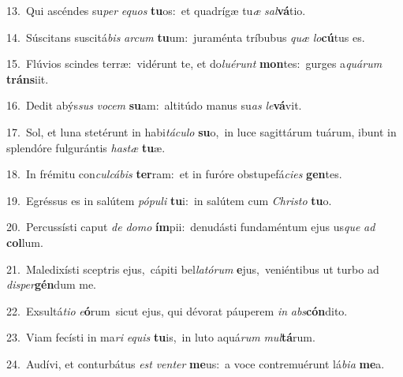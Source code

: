 {\numbfont\textcolor{\numbcolor}{13.}}~Qui ascéndes su\textit{per} \textit{e}\-\textit{quos} \textbf{tu}\-os:~\star et quadrígæ tu\textit{æ} \textit{sal}\-\textbf{vá}tio.\par
{\numbfont\textcolor{\numbcolor}{14.}}~Súscitans suscitá\textit{bis} \textit{ar}\-\textit{cum} \textbf{tu}\-um:~\star juraménta tríbubus \textit{quæ} \textit{lo}\-\textbf{cú}tus es.\par
{\numbfont\textcolor{\numbcolor}{15.}}~Flúvios scindes terræ:~\dagger vidérunt te, et do\-\textit{lu}\-\textit{é}\textit{runt} \textbf{mon}\-tes:~\star gurges a\-\textit{quá}\-\textit{rum} \textbf{tráns}\-iit.\par
{\numbfont\textcolor{\numbcolor}{16.}}~Dedit abýs\textit{sus} \textit{vo}\-\textit{cem} \textbf{su}\-am:~\star altitúdo manus su\textit{as} \textit{le}\-\textbf{vá}vit.\par
{\numbfont\textcolor{\numbcolor}{17.}}~Sol, et luna stetérunt in habi\-\textit{tá}\-\textit{cu}\textit{lo} \textbf{su}\-o,~\star in luce sagittárum tuárum, ibunt in splendóre fulgurántis \textit{has}\-\textit{tæ} \textbf{tu}\-æ.\par
{\numbfont\textcolor{\numbcolor}{18.}}~In frémitu con\-\textit{cul}\-\textit{cá}\textit{bis} \textbf{ter}\-ram:~\star et in furóre obstupefá\-\textit{ci}\-\textit{es} \textbf{gen}\-tes.\par
{\numbfont\textcolor{\numbcolor}{19.}}~Egréssus es in salútem \textit{pó}\-\textit{pu}\textit{li} \textbf{tu}\-i:~\star in salútem cum \textit{Chris}\-\textit{to} \textbf{tu}\-o.\par
{\numbfont\textcolor{\numbcolor}{20.}}~Percussísti caput \textit{de} \textit{do}\-\textit{mo} \textbf{ím}\-pii:~\star denudásti fundaméntum ejus us\textit{que} \textit{ad} \textbf{col}\-lum.\par
{\numbfont\textcolor{\numbcolor}{21.}}~Maledixísti sceptris ejus,~\dagger cápiti bel\-\textit{la}\-\textit{tó}\textit{rum} \textbf{e}\-jus,~\star veniéntibus ut turbo ad \textit{di}\-\textit{sper}\textbf{gén}dum me.\par
{\numbfont\textcolor{\numbcolor}{22.}}~Exsultá\-\textit{ti}\-\textit{o} \textit{e}\-\textbf{ó}rum~\star sicut ejus, qui dévorat páuperem \textit{in} \textit{abs}\-\textbf{cón}dito.\par
{\numbfont\textcolor{\numbcolor}{23.}}~Viam fecísti in ma\textit{ri} \textit{e}\-\textit{quis} \textbf{tu}\-is,~\star in luto aquá\textit{rum} \textit{mul}\-\textbf{tá}rum.\par
{\numbfont\textcolor{\numbcolor}{24.}}~Audívi, et conturbátus \textit{est} \textit{ven}\-\textit{ter} \textbf{me}\-us:~\star a voce contremuérunt lá\-\textit{bi}\-\textit{a} \textbf{me}\-a.\par
